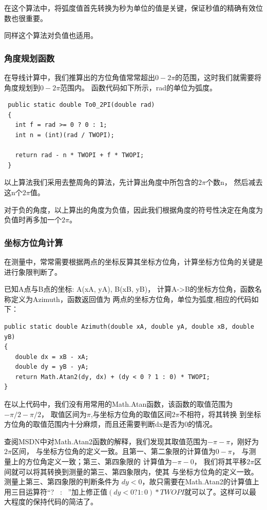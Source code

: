 在这个算法中，将弧度值首先转换为秒为单位的值是关键，保证秒值的精确有效位数也很重要。

同样这个算法对负值也适用。



\subsubsection{角度规划函数}

在导线计算中，我们推算出的方位角值常常超出$0 -2\pi$的范围，这时我们就需要将角度规划到$0 -2\pi$范围内。
函数代码如下所示，rad的单位为弧度。

\begin{lstlisting}
 public static double To0_2PI(double rad)
 {
   int f = rad >= 0 ? 0 : 1;
   int n = (int)(rad / TWOPI);

   return rad - n * TWOPI + f * TWOPI;
 }
 \end{lstlisting}

 以上算法我们采用去整周角的算法，先计算出角度中所包含的$2\pi$个数n，
 然后减去这n个$2\pi$值。

 对于负的角度，以上算出的角度为负值，因此我们根据角度的符号性决定在角度为负值时再多加一个$2\pi$。


\subsubsection{坐标方位角计算}

在测量中，常常需要根据两点的坐标反算其坐标方位角，计算坐标方位角的关键是进行象限判断了。

已知A点与B点的坐标: A(xA, yA), B(xB, yB)， 计算A->B的坐标方位角，函数名称定义为Azimuth，函数返回值为
两点的坐标方位角，单位为弧度,相应的代码如下：

\begin{lstlisting}
public static double Azimuth(double xA, double yA, double xB, double yB)
{
   double dx = xB - xA;
   double dy = yB - yA;
   return Math.Atan2(dy, dx) + (dy < 0 ? 1 : 0) * TWOPI;
}
\end{lstlisting}

在以上代码中，我们没有用常用的Math.Atan函数，该函数的取值范围为$-\pi /2 - \pi/2$，
取值区间为$\pi$,与坐标方位角的取值区间$2\pi$不相符，将其转换
到坐标方位角的取值范围内十分麻烦，而且还需要判断dx是否为0的情况。

查阅MSDN中对Math.Atan2函数的解释，我们发现其取值范围为$-\pi - \pi$，刚好为$2\pi$区间，
与坐标方位角的定义一致。且第一、第二象限的计算值为$0-\pi$， 与测量上的方位角定义一致；第三、第四象限的
计算值为$-\pi - 0$， 我们将其平移$2\pi$区间就可以将其转换到测量的第三、第四象限内，使其
与坐标方位角的定义一致。测量上第三、第四象限的判断条件为 $dy<0$，故只需要在Math.Atan2的计算值上
用三目运算符``?~ : ~''加上修正值$(dy < 0 ? 1 : 0) * TWOPI$就可以了。这样可以最大程度的保持代码的简洁了。

